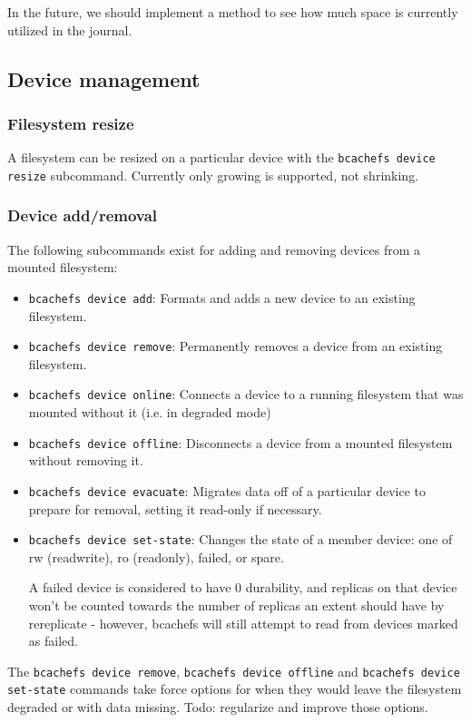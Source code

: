 \documentclass{article}
\begin{document}
In the future, we should implement a method to see how much space is currently
utilized in the journal.

\subsection{Device management}

\subsubsection{Filesystem resize}

A filesystem can be resized on a particular device with the
\texttt{bcachefs device resize} subcommand. Currently only growing is supported,
not shrinking.

\subsubsection{Device add/removal}

The following subcommands exist for adding and removing devices from a mounted
filesystem:
\begin{itemize}
	\item \texttt{bcachefs device add}: Formats and adds a new device to an
		existing filesystem.
	\item \texttt{bcachefs device remove}: Permanently removes a device from
		an existing filesystem.
	\item \texttt{bcachefs device online}: Connects a device to a running
		filesystem that was mounted without it (i.e. in degraded mode)
	\item \texttt{bcachefs device offline}: Disconnects a device from a
		mounted filesystem without removing it.
	\item \texttt{bcachefs device evacuate}: Migrates data off of a
		particular device to prepare for removal, setting it read-only
		if necessary.
	\item \texttt{bcachefs device set-state}: Changes the state of a member
		device: one of rw (readwrite), ro (readonly), failed, or spare.

		A failed device is considered to have 0 durability, and replicas
		on that device won't be counted towards the number of replicas
		an extent should have by rereplicate - however, bcachefs will
		still attempt to read from devices marked as failed.
\end{itemize}

The \texttt{bcachefs device remove}, \texttt{bcachefs device offline} and
\texttt{bcachefs device set-state} commands take force options for when they
would leave the filesystem degraded or with data missing. Todo: regularize and
improve those options.
\end{document}
